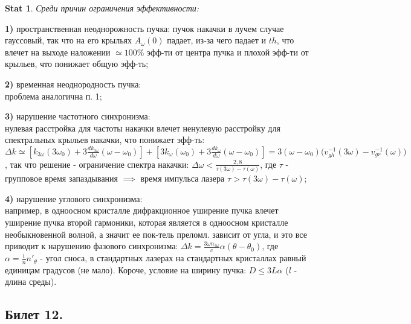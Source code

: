 \documentclass[a4paper,12pt]{article}
\theoremstyle{definition} %
\newtheorem{Stat}{Stat}[section]
\theoremstyle{definition} %
\theoremstyle{remark} %
\begin{document}
\begin{Stat}\label{stat \theStat}
	\textit{Среди причин ограничения эффективности:}
	\par \textbf{1)} пространственная неоднорожность пучка:
	пучок накачки в лучем случае гауссовый, так что на его крыльях $A_{\omega}(0)$ падает, из-за чего падает и $th$, что влечет на выходе наложении $\simeq 100\%$ эфф-ти от центра пучка и плохой эфф-ти от крыльев, что понижает общую эфф-ть; \\
	\par \textbf{2)} временная неоднородность пучка: \\
	проблема аналогична п. 1; \\
	\par \textbf{3)} нарушение частотного синхронизма: \\
	нулевая расстройка для частоты накачки влечет ненулевую расстройку для спектральных крыльев накачки, что понижает эфф-ть: $\Delta k \simeq [k_{3\omega}(3\omega_{0})+3\frac{dk_{3\omega}}{d\omega}(\omega-\omega_{0})]+[3k_{\omega}(\omega_{0})+3\frac{dk_{\omega}}{d\omega}(\omega-\omega_{0})] = 3(\omega-\omega_{0}) \big( v_{gh}^{-1}(3\omega) - v_{gr}^{-1}(\omega) \big)$, так что решение - ограничение спектра накачки: $\Delta \omega < \frac{2,8}{\tau (3\omega) - \tau (\omega)}$, где $\tau$ - групповое время запаздывания $\implies$ время импульса лазера $\tau > \tau(3\omega)-\tau(\omega)$; \\ 
	\par \textbf{4)} нарушение углового синхронизма: \\
	например, в одноосном кристалле дифракционное уширение пучка влечет уширение пучка второй гармоники, которая является в одноосном кристалле необыкновенной волной, а значит ее пок-тель преломл. зависит от угла, и это все приводит к нарушению фазового синхронизма: $\Delta k = \frac{3\omega n_{3\omega}}{c}\alpha (\theta - \theta_{0})$, где $\alpha = \frac{1}{n}n'_{\theta}$ - угол сноса, в стандартных лазерах на стандартных кристаллах равный единицам градусов (не мало). Короче, условие на ширину пучка: $D \leq 3L \alpha$ ($l$ - длина среды).
\end{Stat}

\subsection{Билет 12.}
\end{document}
